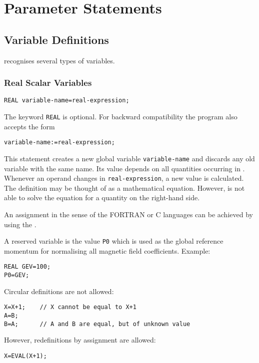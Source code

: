 \section{Parameter Statements}
\label{sec:parameter}

\subsection{Variable Definitions}
\label{sec:variable}
\opal recognises several types of variables.

\subsubsection{Real Scalar Variables}
\begin{verbatim}
REAL variable-name=real-expression;
\end{verbatim}
The keyword \texttt{REAL} is optional.
For backward compatibility the program also accepts the form
\begin{verbatim}
variable-name:=real-expression;
\end{verbatim}
This statement creates a new global variable \texttt{variable-name}
and discards any old variable with the same name.
Its value depends on all quantities occurring
in .
Whenever an operand changes in \texttt{real-expression},
a new value is calculated.
The definition may be thought of as a mathematical equation.
However, \opal is not able to solve the equation for a quantity on the
right-hand side.

An assignment in the sense of the FORTRAN or C languages can be achieved
by using the .

A reserved variable is the value \texttt{P0} which is used as the
global reference momentum for normalising all magnetic field coefficients.
\noindent Example:
\begin{verbatim}
REAL GEV=100;
P0=GEV;
\end{verbatim}
Circular definitions are not allowed:
\begin{verbatim}
X=X+1;    // X cannot be equal to X+1
A=B;
B=A;      // A and B are equal, but of unknown value
\end{verbatim}
However, redefinitions by assignment are allowed:
\begin{verbatim}
X=EVAL(X+1);
\end{verbatim}

